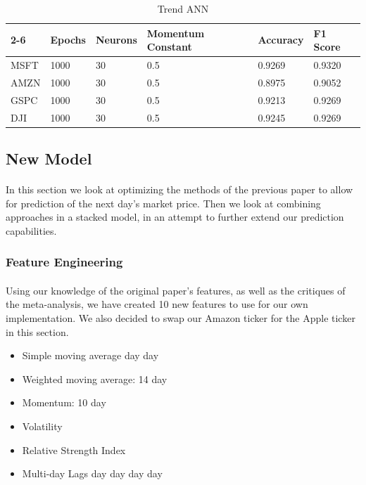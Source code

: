 \documentclass[11pt]{article}
\begin{document}
				\begin{table}[h]
					\centering
					\begin{tabular}{l|l|l|l|l|l|}
						\cline{2-6}
						& Epochs & Neurons & Momentum Constant & Accuracy & F1 Score \\ \hline
						\multicolumn{1}{|l|}{MSFT} & 1000   & 30      & 0.5               & 0.9269   & 0.9320         \\ \hline
						\multicolumn{1}{|l|}{AMZN} & 1000   & 30      & 0.5               & 0.8975   & 0.9052         \\ \hline
						\multicolumn{1}{|l|}{GSPC} & 1000   & 30      & 0.5               & 0.9213   & 0.9269         \\ \hline
						\multicolumn{1}{|l|}{DJI}  & 1000   & 30      & 0.5               & 0.9245   & 0.9269         \\ \hline
					\end{tabular}
					\caption{Trend ANN}
				\end{table}
			
		\subsection{New Model}
		
			\paragraph{} In this section we look at optimizing the methods of the previous paper to allow for prediction of the next day's market price. Then we look at combining approaches in a stacked model, in an attempt to further extend our prediction capabilities.
		
			\subsubsection{Feature Engineering}
			
				\paragraph{} Using our knowledge of the original paper's features, as well as the critiques of the meta-analysis, we have created 10 new features to use for our own implementation. We also decided to swap our Amazon ticker for the Apple ticker in this section.
				
				\begin{itemize}
					\item Simple moving average
						 day
						 day
					\item Weighted moving average: 14 day
					\item Momentum: 10 day
					\item Volatility
					\item Relative Strength Index
					\item Multi-day Lags
						 day
						 day
						 day
						 day
				\end{itemize}
				
\end{document}
